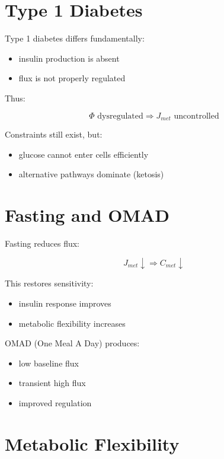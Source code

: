 \documentclass[12pt,a4paper]{article}
\begin{document}
\section{Type 1 Diabetes}

Type 1 diabetes differs fundamentally:

\begin{itemize}
    \item insulin production is absent
    \item flux is not properly regulated
\end{itemize}

Thus:

\begin{equation}
\Phi \text{ dysregulated} \Rightarrow J_{met} \text{ uncontrolled}
\end{equation}

Constraints still exist, but:

\begin{itemize}
    \item glucose cannot enter cells efficiently
    \item alternative pathways dominate (ketosis)
\end{itemize}

\section{Fasting and OMAD}

Fasting reduces flux:

\begin{equation}
J_{met} \downarrow \Rightarrow C_{met} \downarrow
\end{equation}

This restores sensitivity:

\begin{itemize}
    \item insulin response improves
    \item metabolic flexibility increases
\end{itemize}

OMAD (One Meal A Day) produces:

\begin{itemize}
    \item low baseline flux
    \item transient high flux
    \item improved regulation
\end{itemize}

\section{Metabolic Flexibility}
\end{document}
